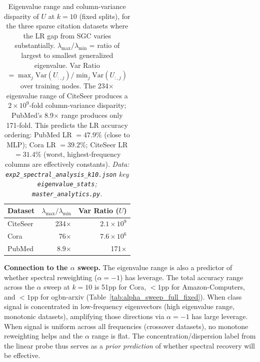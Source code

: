 \documentclass[11pt]{article}
\begin{document}
\begin{table}[H]
\centering\small
\caption{Eigenvalue range and column-variance disparity of $U$ at $k{=}10$ (fixed splits),
for the three sparse citation datasets where the LR gap from SGC varies substantially.
$\lambda_{\max}/\lambda_{\min}$ = ratio of largest to smallest generalized eigenvalue.
Var Ratio $= \max_j \mathrm{Var}(U_{:,j}) / \min_j \mathrm{Var}(U_{:,j})$ over training nodes.
The 234$\times$ eigenvalue range of CiteSeer produces a $2{\times}10^9$-fold column-variance
disparity; PubMed's 8.9$\times$ range produces only 171-fold.
This predicts the LR accuracy ordering: PubMed LR $= 47.9\%$ (close to MLP);
Cora LR $= 39.2\%$; CiteSeer LR $= 31.4\%$ (worst, highest-frequency columns
are effectively constants).
\textit{\scriptsize Data: \texttt{exp2\_spectral\_analysis\_k10.json}
key \texttt{eigenvalue\_stats}; \texttt{master\_analytics.py}.}}
\label{tab:eigenvalue_range}
\begin{tabular}{lrr}
\toprule
Dataset & $\lambda_{\max}/\lambda_{\min}$ & Var Ratio ($U$) \\
\midrule
CiteSeer & 234$\times$  & $2.1\times10^9$ \\
Cora     & 76$\times$   & $7.6\times10^6$ \\
PubMed   & 8.9$\times$  & 171$\times$ \\
\bottomrule
\end{tabular}
\end{table}

\noindent\textbf{Connection to the $\alpha$ sweep.}
The eigenvalue range is also a predictor of whether spectral reweighting ($\alpha{=}-1$)
has leverage.  The total accuracy range across the $\alpha$ sweep at $k{=}10$ is
51pp for Cora, $<1$pp for Amazon-Computers, and $<1$pp for ogbn-arxiv
(Table~\ref{tab:alpha_sweep_full_fixed}).  When class signal is concentrated in
low-frequency eigenvectors (high eigenvalue range, monotonic datasets), amplifying
those directions via $\alpha{=}-1$ has large leverage.  When signal is uniform across
all frequencies (crossover datasets), no monotone reweighting helps and the $\alpha$
range is flat.  The concentration/dispersion label from the linear probe thus serves
as a \emph{prior prediction} of whether spectral recovery will be effective.
\end{document}
